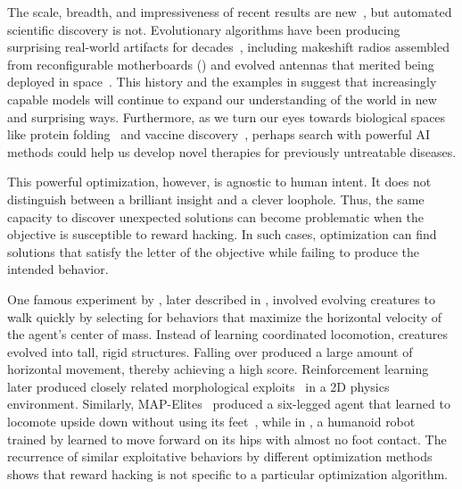 \documentclass[10pt]{article}
\def\citep#1{}%
\def\citet#1{}%
\begin{document}
The scale, breadth, and impressiveness of recent results are new~\citep{sothanaphan2026resolutionerdhosproblem728, tao2026jacobian, alexeev2026primitivesetsvonmangoldt, openai2026discretegeometry}, but automated scientific discovery is not.
Evolutionary algorithms have been producing surprising real-world artifacts for decades~\citep{BirdRadio, Hornby2006, lehman2018surprising}, including makeshift radios assembled from reconfigurable motherboards () and evolved antennas that merited being deployed in space~\citep{Hornby2006}. 
This history and the examples in  suggest that increasingly capable models will continue to expand our understanding of the world in new and surprising ways. 
Furthermore, as we turn our eyes towards biological spaces like protein folding~\citep{jumper2021highly} and vaccine discovery~\citep{Bhattacharya2025, Bravi2024}, perhaps search with powerful AI methods could help us develop novel therapies for previously untreatable diseases.

This powerful optimization, however, is agnostic to human intent.
It does not distinguish between a brilliant insight and a clever loophole. 
Thus, the same capacity to discover unexpected solutions can become problematic when the objective is susceptible to reward hacking. 
In such cases, optimization can find solutions that satisfy the letter of the objective while failing to produce the intended behavior.

One famous experiment by \citet{sims1994evolving, Sims1994evolvingvirtualcreatures}, later described in \citet{lehman2018surprising}, involved evolving creatures to walk quickly by selecting for behaviors that maximize the horizontal velocity of the agent's center of mass. Instead of learning coordinated locomotion, creatures evolved into tall, rigid structures.
Falling over produced a large amount of horizontal movement, thereby achieving a high score. 
Reinforcement learning later produced closely related morphological exploits~\citep{Ha2018designrl} in a 2D physics environment.
Similarly, MAP-Elites~\citep{cully2015robots} produced a six-legged agent that learned to locomote upside down without using its feet~\citep{lehman2018surprising}, while in , a humanoid robot trained by \citet{batra2024proximalpolicygradientarborescence} learned to move forward on its hips with almost no foot contact.
The recurrence of similar exploitative behaviors by different optimization methods shows that reward hacking is not specific to a particular optimization algorithm.
\end{document}
